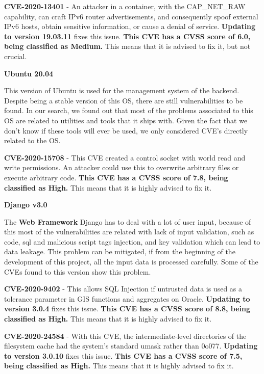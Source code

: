 \textbf{CVE-2020-13401} - An attacker in a container, with the CAP\_NET\_RAW capability, can craft IPv6 router advertisements, and consequently spoof external IPv6 hosts, obtain sensitive information, or cause a denial of service.\cite{docker1} \textbf{Updating to version 19.03.11} fixes this issue. \textbf{This CVE has a CVSS score of 6.0, being classified as Medium.} This means that it is advised to fix it, but not crucial.


\vspace{0.4cm}

\textbf{Ubuntu 20.04}

This version of Ubuntu is used for the management system of the backend. Despite being a stable version of this OS, there are still vulnerabilities to be found. In our search, we found out that most of the problems associated to this OS are related to utilities and tools that it ships with. Given the fact that we don't know if these tools will ever be used, we only considered CVE's directly related to the OS.

\textbf{CVE-2020-15708} - This CVE created a control socket with world read and write permissions. An attacker could use this to overwrite arbitrary files or execute arbitrary code.
\cite{ubuntu1} \textbf{This CVE has a CVSS score of 7.8, being classified as High.} This means that it is highly advised to fix it.


\vspace{0.4cm}

\textbf{Django v3.0}

The \textbf{Web Framework} Django has to deal with a lot of user input, because of this most of the vulnerabilities are related with lack of input validation, such as code, sql and malicious script tags injection, and key validation which can lead to data leakage. This problem can be mitigated, if from the beginning of the development of this project, all the input data is processed carefully. Some of the CVEs found to this version show this problem.

\textbf{CVE-2020-9402} - This allows SQL Injection if untrusted data is used as a tolerance parameter in GIS functions and aggregates on Oracle.\cite{django1} \textbf{Updating to version 3.0.4} fixes this issue. \textbf{This CVE has a CVSS score of 8.8, being classified as High.} This means that it is highly advised to fix it.

\textbf{CVE-2020-24584} - With this CVE, the intermediate-level directories of the filesystem cache had the system's standard umask rather than 0o077.\cite{django2} \textbf{Updating to version 3.0.10} fixes this issue. \textbf{This CVE has a CVSS score of 7.5, being classified as High.} This means that it is highly advised to fix it.


